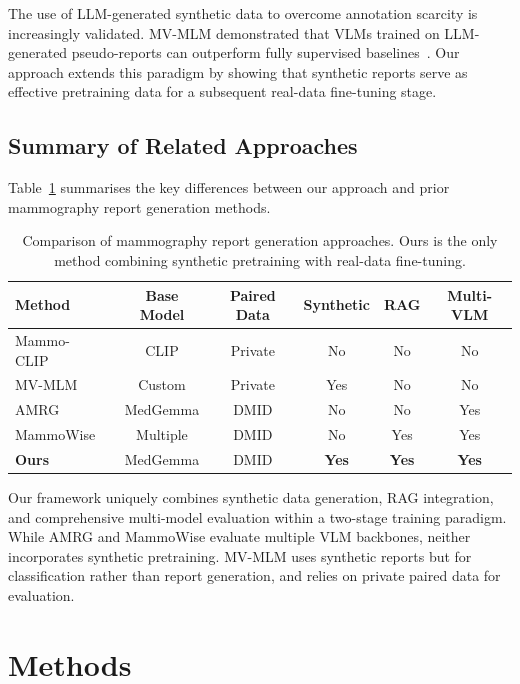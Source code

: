 \documentclass{wlscirep}
\begin{document}
The use of LLM-generated synthetic data to overcome annotation scarcity is increasingly validated. MV-MLM demonstrated that VLMs trained on LLM-generated pseudo-reports can outperform fully supervised baselines~\cite{ahmed2025}. Our approach extends this paradigm by showing that synthetic reports serve as effective pretraining data for a subsequent real-data fine-tuning stage.

\subsection*{Summary of Related Approaches}

Table~\ref{tab:related} summarises the key differences between our approach and prior mammography report generation methods.

\begin{table}[H]
\centering
\caption{Comparison of mammography report generation approaches. Ours is the only method combining synthetic pretraining with real-data fine-tuning.}
\label{tab:related}
\small
\begin{tabular}{lccccc}
\toprule
\textbf{Method} & \textbf{Base Model} & \textbf{Paired Data} & \textbf{Synthetic} & \textbf{RAG} & \textbf{Multi-VLM} \\
\midrule
Mammo-CLIP~\cite{ghosh2024}  & CLIP       & Private    & No  & No  & No  \\
MV-MLM~\cite{ahmed2025}      & Custom     & Private    & Yes & No  & No  \\
AMRG~\cite{sung2025}         & MedGemma   & DMID       & No  & No  & Yes \\
MammoWise~\cite{jahangir2026}& Multiple   & DMID       & No  & Yes & Yes \\
\textbf{Ours}                 & MedGemma   & DMID       & \textbf{Yes} & \textbf{Yes} & \textbf{Yes} \\
\bottomrule
\end{tabular}
\end{table}

Our framework uniquely combines synthetic data generation, RAG integration, and comprehensive multi-model evaluation within a two-stage training paradigm. While AMRG and MammoWise evaluate multiple VLM backbones, neither incorporates synthetic pretraining. MV-MLM uses synthetic reports but for classification rather than report generation, and relies on private paired data for evaluation.

\section*{Methods}
\end{document}
